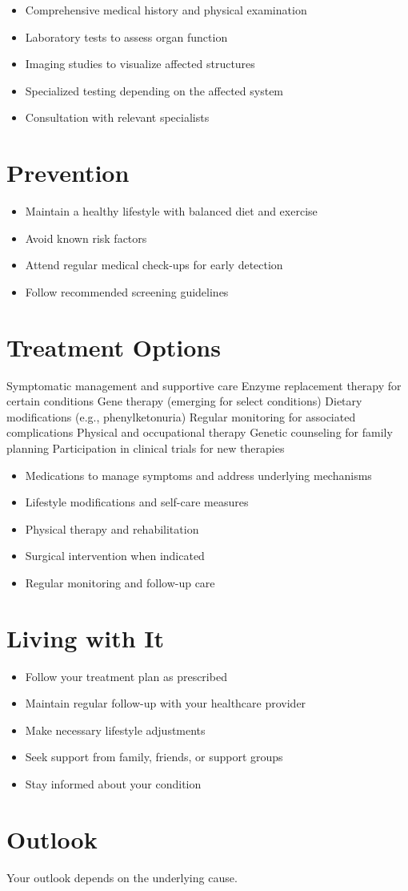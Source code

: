 \begin{itemize}[noitemsep]
  \item Comprehensive medical history and physical examination
  \item Laboratory tests to assess organ function
  \item Imaging studies to visualize affected structures
  \item Specialized testing depending on the affected system
  \item Consultation with relevant specialists
\end{itemize}
\section{Prevention}
\begin{itemize}[noitemsep]
  \item Maintain a healthy lifestyle with balanced diet and exercise
  \item Avoid known risk factors
  \item Attend regular medical check-ups for early detection
  \item Follow recommended screening guidelines
\end{itemize}
\section{Treatment Options}
Symptomatic management and supportive care Enzyme replacement therapy for certain conditions Gene therapy (emerging for select conditions) Dietary modifications (e.g., phenylketonuria) Regular monitoring for associated complications Physical and occupational therapy Genetic counseling for family planning Participation in clinical trials for new therapies

\begin{itemize}[noitemsep]
  \item Medications to manage symptoms and address underlying mechanisms
  \item Lifestyle modifications and self-care measures
  \item Physical therapy and rehabilitation
  \item Surgical intervention when indicated
  \item Regular monitoring and follow-up care
\end{itemize}
\section{Living with It}
\begin{itemize}[noitemsep]
  \item Follow your treatment plan as prescribed
  \item Maintain regular follow-up with your healthcare provider
  \item Make necessary lifestyle adjustments
  \item Seek support from family, friends, or support groups
  \item Stay informed about your condition
\end{itemize}
\section{Outlook}
Your outlook depends on the underlying cause.
